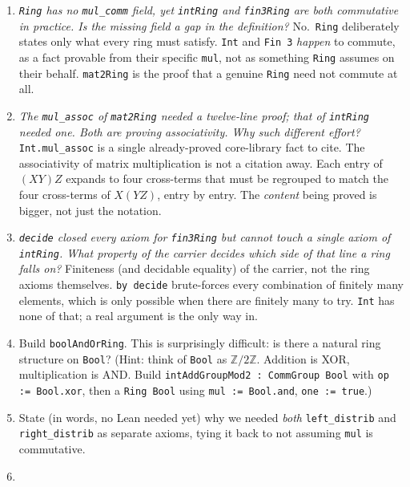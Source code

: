 \begin{enumerate}
\def\labelenumi{\arabic{enumi}.}
\item
  \emph{\texttt{Ring} has no \texttt{mul\_\allowbreak{}comm} field, yet \texttt{intRing} and \texttt{fin3Ring} are both commutative in practice. Is the missing field a gap in the definition?} No.~\texttt{Ring} deliberately states only what every ring must satisfy. \texttt{Int} and \texttt{Fin 3} \emph{happen} to commute, as a fact provable from their specific \texttt{mul}, not as something \texttt{Ring} assumes on their behalf. \texttt{mat2Ring} is the proof that a genuine \texttt{Ring} need not commute at all.
\item
  \emph{The \texttt{mul\_\allowbreak{}assoc} of \texttt{mat2Ring} needed a twelve-line proof; that of \texttt{intRing} needed one. Both are proving associativity. Why such different effort?} \texttt{Int.mul\_\allowbreak{}assoc} is a single already-proved core-library fact to cite. The associativity of matrix multiplication is not a citation away. Each entry of \((XY)Z\) expands to four cross-terms that must be regrouped to match the four cross-terms of \(X(YZ)\), entry by entry. The \emph{content} being proved is bigger, not just the notation.
\item
  \emph{\texttt{decide} closed every axiom for \texttt{fin3Ring} but cannot touch a single axiom of \texttt{intRing}. What property of the carrier decides which side of that line a ring falls on?} Finiteness (and decidable equality) of the carrier, not the ring axioms themselves. \texttt{by decide} brute-forces every combination of finitely many elements, which is only possible when there are finitely many to try. \texttt{Int} has none of that; a real argument is the only way in.
\item
  Build \texttt{boolAndOrRing}. This is surprisingly difficult: is there a natural ring structure on \texttt{Bool}? (Hint: think of \texttt{Bool} as \(\mathbb{Z}/2\mathbb{Z}\). Addition is XOR, multiplication is AND. Build \texttt{intAddGroupMod2 : CommGroup Bool} with \texttt{op := Bool.xor}, then a \texttt{Ring Bool} using \texttt{mul := Bool.and}, \texttt{one := true}.)
\item
  State (in words, no Lean needed yet) why we needed \emph{both} \texttt{left\_\allowbreak{}distrib} and \texttt{right\_\allowbreak{}distrib} as separate axioms, tying it back to not assuming \texttt{mul} is commutative.
\item

\end{enumerate}
